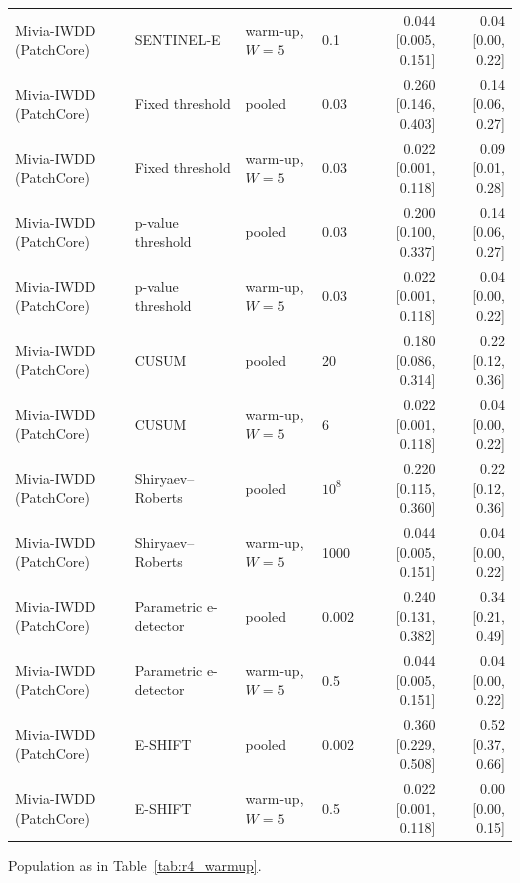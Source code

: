 \begin{table}[t]
{\begin{tabular}{llllrr}
Mivia-IWDD (PatchCore) & SENTINEL-E & warm-up, $W=5$ & 0.1 & 0.044 [0.005, 0.151] & 0.04 [0.00, 0.22] \\
Mivia-IWDD (PatchCore) & Fixed threshold & pooled & 0.03 & 0.260 [0.146, 0.403] & 0.14 [0.06, 0.27] \\
Mivia-IWDD (PatchCore) & Fixed threshold & warm-up, $W=5$ & 0.03 & 0.022 [0.001, 0.118] & 0.09 [0.01, 0.28] \\
Mivia-IWDD (PatchCore) & p-value threshold & pooled & 0.03 & 0.200 [0.100, 0.337] & 0.14 [0.06, 0.27] \\
Mivia-IWDD (PatchCore) & p-value threshold & warm-up, $W=5$ & 0.03 & 0.022 [0.001, 0.118] & 0.04 [0.00, 0.22] \\
Mivia-IWDD (PatchCore) & CUSUM & pooled & 20 & 0.180 [0.086, 0.314] & 0.22 [0.12, 0.36] \\
Mivia-IWDD (PatchCore) & CUSUM & warm-up, $W=5$ & 6 & 0.022 [0.001, 0.118] & 0.04 [0.00, 0.22] \\
Mivia-IWDD (PatchCore) & Shiryaev--Roberts & pooled & $10^{8}$ & 0.220 [0.115, 0.360] & 0.22 [0.12, 0.36] \\
Mivia-IWDD (PatchCore) & Shiryaev--Roberts & warm-up, $W=5$ & 1000 & 0.044 [0.005, 0.151] & 0.04 [0.00, 0.22] \\
Mivia-IWDD (PatchCore) & Parametric e-detector & pooled & 0.002 & 0.240 [0.131, 0.382] & 0.34 [0.21, 0.49] \\
Mivia-IWDD (PatchCore) & Parametric e-detector & warm-up, $W=5$ & 0.5 & 0.044 [0.005, 0.151] & 0.04 [0.00, 0.22] \\
Mivia-IWDD (PatchCore) & E-SHIFT & pooled & 0.002 & 0.360 [0.229, 0.508] & 0.52 [0.37, 0.66] \\
Mivia-IWDD (PatchCore) & E-SHIFT & warm-up, $W=5$ & 0.5 & 0.022 [0.001, 0.118] & 0.00 [0.00, 0.15] \\
\bottomrule
\end{tabular}}
\begin{minipage}{\linewidth}\vspace{2pt}\footnotesize Population as in Table~\ref{tab:r4_warmup}.\end{minipage}
\end{table}
